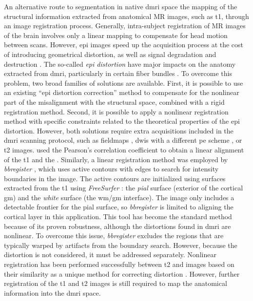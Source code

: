 An alternative route to segmentation in native \gls*{dmri} space the mapping of the
  structural information extracted from anatomical MR images, such as \gls*{t1}, through
  an image registration process.
Generally, intra-subject registration of MR images of the brain involves only a linear
  mapping to compensate for head motion between scans.
However, \gls*{epi} images speed up the acquisition process at the cost of introducing geometrical
  distortion, as well as signal degradation and destruction \citep{jezzard_correction_1995}.
The so-called \emph{\gls*{epi} distortion} have major impacts on the anatomy extracted
  from \gls*{dmri}, particularly in certain fiber bundles \citep{irfanoglu_effects_2012}.
To overcome this problem, two broad families of solutions are available.
First, it is possible to use an existing ``\gls*{epi} distortion correction''
  method to compensate for the nonlinear part of the misalignment with the structural space, combined
  with a rigid registration method.
Second, it is possible to apply a nonlinear registration method with specific constraints
  related to the theoretical properties of the \gls*{epi} distortion.
However, both solutions require extra acquisitions included in the \gls*{dmri} scanning protocol,
  such as fieldmaps \citep{jezzard_correction_1995}, \glspl*{dwi} with a different \gls*{pe}
  scheme \citep{cordes_geometric_2000,chiou_simple_2000}, or \gls*{t2} images.
\cite{saad_new_2009} used the Pearson's correlation coefficient to obtain a linear alignment of
  the \gls*{t1} and the \lowb{}.
Similarly, a linear registration method was employed by \emph{bbregister} \citep{greve_accurate_2009},
  which uses active contours with edges to search for intensity boundaries in the \lowb{}
  image.
The active contours are initialized using surfaces extracted from the \gls*{t1} using
  \emph{FreeSurfer} \citep{fischl_freesurfer_2012}: the \emph{pial} surface (exterior of the
  cortical \gls*{gm}) and the \emph{white} surface (the \gls*{wm}/\gls*{gm} interface).
The \lowb{} image only includes a detectable frontier for the pial surface, so
  \emph{bbregister} is limited to aligning the cortical layer in this
  application.
This tool has become the standard method because of its proven robustness, although the
  distortions found in \gls*{dmri} are nonlinear.
To overcome this issue, \emph{bbregister} excludes the
  regions that are typically warped by artifacts from the boundary search.
However, because the distortion is not considered, it must be addressed separately.
Nonlinear registration has been performed successfully between \gls*{t2} and \lowb{}
  images based on their similarity as a unique method for correcting distortion
  \citep{kybic_unwarping_2000,studholme_accurate_2000,wu_comparison_2008,tao_variational_2009}.
However, further registration of the \gls*{t1} and \gls*{t2} images is still required to map the anatomical
  information into the \gls*{dmri} space.

